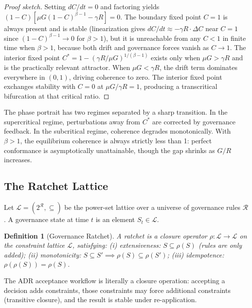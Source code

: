 \documentclass[11pt, a4paper, logo, copyright]{googledeepmind}
\newtheorem{definition}{Definition}[section]
\begin{document}
\begin{proof}[Proof sketch]
Setting $dC/dt = 0$ and factoring yields $(1 - C)[\mu G (1 - C)^{\beta - 1} - \gamma R] = 0$. The boundary fixed point $C = 1$ is always present and is stable (linearization gives $dC/dt \approx -\gamma R \cdot \Delta C$ near $C = 1$ since $(1-C)^{\beta-1} \to 0$ for $\beta > 1$), but it is unreachable from any $C < 1$ in finite time when $\beta > 1$, because both drift and governance forces vanish as $C \to 1$. The interior fixed point $C^* = 1 - (\gamma R / \mu G)^{1/(\beta - 1)}$ exists only when $\mu G > \gamma R$ and is the practically relevant attractor. When $\mu G < \gamma R$, the drift term dominates everywhere in $(0, 1)$, driving coherence to zero. The interior fixed point exchanges stability with $C = 0$ at $\mu G / \gamma R = 1$, producing a transcritical bifurcation at that critical ratio.
\end{proof}

The phase portrait has two regimes separated by a sharp transition. In the supercritical regime, perturbations away from $C^*$ are corrected by governance feedback. In the subcritical regime, coherence degrades monotonically. With $\beta > 1$, the equilibrium coherence is always strictly less than 1: perfect conformance is asymptotically unattainable, though the gap shrinks as $G/R$ increases.

\subsection{The Ratchet Lattice}

Let $\mathcal{L} = (2^{\mathcal{R}}, \subseteq)$ be the power-set lattice over a universe of governance rules $\mathcal{R}$. A governance state at time $t$ is an element $S_t \in \mathcal{L}$.

\begin{definition}[Governance Ratchet]
\label{def:ratchet}
A ratchet is a closure operator $\rho: \mathcal{L} \to \mathcal{L}$ on the constraint lattice $\mathcal{L}$, satisfying: (i) extensiveness: $S \subseteq \rho(S)$ (rules are only added); (ii) monotonicity: $S \subseteq S' \implies \rho(S) \subseteq \rho(S')$; (iii) idempotence: $\rho(\rho(S)) = \rho(S)$.
\end{definition}

The ADR acceptance workflow is literally a closure operation: accepting a decision adds constraints, those constraints may force additional constraints (transitive closure), and the result is stable under re-application.
\end{document}
